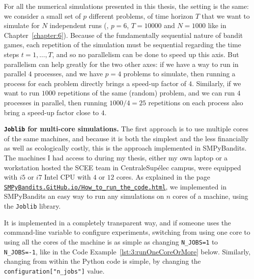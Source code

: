 For all the numerical simulations presented in this thesis,
the setting is the same:
we consider a small set of $p$ different problems, of time horizon $T$ that we want to simulate for $N$ independent runs (\eg, $p=6$, $T=10000$ and $N=1000$ like in Chapter~\ref{chapter:6}).
%
Because of the fundamentally sequential nature of bandit games, each repetition of the simulation must be sequential regarding the time steps $t=1,\dots,T$, and so no parallelism can be done to speed up this axis.
But parallelism can help greatly for the two other axes: if we have a way to run in parallel $4$ processes, and we have $p=4$ problems to simulate, then running a process for each problem directly brings a speed-up factor of $4$.
Similarly, if we want to run $1000$ repetitions of the same (random) problem, and we can run $4$ processes in parallel, then running $1000/4=25$ repetitions on each process also bring a speed-up factor close to $4$.
%

\textbf{\texttt{Joblib} for multi-core simulations.}
%
The first approach is to use multiple cores of the same machines, and because it is both the simplest and the less financially as well as ecologically costly, this is the approach implemented in SMPyBandits.
The machines I had access to during my thesis, either my own laptop or a workstation hosted the SCEE team in CentraleSupélec campus, were equipped with $i5$ or $i7$ Intel CPU with $4$ or $12$ cores.
%
As explained in the page \href{https://smpybandits.github.io/How_to_run_the_code.html}{\texttt{SMPyBandits.GitHub.io/How\_to\_run\_the\_code.html}}, we implemented in SMPyBandits an easy way to run any simulations on $n$ cores of a machine, using the \texttt{Joblib} \cite{joblib} library.

It is implemented in a completely transparent way, and if someone uses the command-line variable to configure experiments, switching from using one core to using all the cores of the machine is as simple as changing \texttt{N\_JOBS=1} to \texttt{N\_JOBS=-1}, like in the Code Example~\ref{lst:3:runOneCoreOrMore} below.
Similarly, changing from within the Python code is simple, by changing the \texttt{configuration["n\_jobs"]} value.


